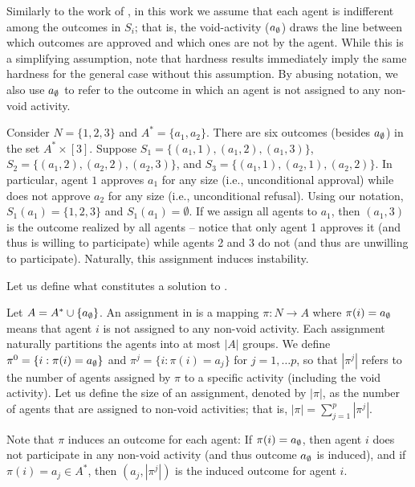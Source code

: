 Similarly to the work of \cite{GASP12WINE}, in this work we assume that each agent is indifferent among the outcomes in $S_i$; that is, the void-activity ($a_{\emptyset}$) draws the line between which outcomes are approved and which ones are not by the agent. While this is a simplifying assumption, note that hardness results immediately imply the same hardness for the general case without this assumption. By abusing notation, we also use $a_{\emptyset}$ to refer to the outcome in which an agent is not assigned to any non-void activity. 

\begin{example} \label{GASP:eg:notation}
	Consider $N = \{1, 2, 3\}$ and $A^* = \{a_1, a_2\}$. There are six outcomes (besides $a_{\emptyset}$) in the set $A^* \times [3]$. 
	Suppose $S_1 = \{(a_1, 1), (a_1, 2), (a_1, 3)\}$, $S_2 = \{(a_1,2), (a_2,2), (a_2, 3)\}$, and $S_3 = \{(a_1,1), (a_2, 1), (a_2, 2)\}$. In particular, agent $1$ approves $a_1$ for any size (i.e., unconditional approval) while does not approve $a_2$ for any size (i.e., unconditional refusal). Using our notation, $S_1(a_1) = \{1,2,3\}$ and $S_1(a_1) = \emptyset$. If we assign all agents to $a_1$, then $(a_1,3)$ is the outcome realized by all agents -- notice that only agent 1 approves it (and thus is willing to participate) while agents 2 and 3 do not (and thus are unwilling to participate). Naturally, this assignment induces instability. 
\end{example}


Let us define what constitutes a solution to \GASP.

\begin{definition} \label{GASP:def:assignment}
	Let $A = A^* \cup \{a_{\emptyset}\}$.
An assignment in \GASPs is a mapping $\pi: N \rightarrow A$ where $\pi(i) = a_{\emptyset}$ means that agent $i$ is not assigned to any non-void activity. 
Each assignment naturally partitions the agents into at most $|A|$ groups. We define $\pi^0 = \{i : \pi(i) = a_{\emptyset} \}$ and $\pi^j = \{i : \pi(i) = a_j\}$ for $j = 1, \dots p$, so that $|\pi^j|$ refers to the number of agents assigned by $\pi$ to a specific activity (including the void activity).
Let us define the size of an assignment, denoted by $|\pi|$, as the number of agents that are assigned to non-void activities; that is, $|\pi| = \sum_{j=1}^{p} |\pi^j|$.
\end{definition}

Note that $\pi$ induces an outcome for each agent: If $\pi(i) = a_{\emptyset}$, then agent $i$ does not participate in any non-void activity (and thus outcome $a_{\emptyset}$ is induced), and if $\pi(i) = a_j \in A^*$, then $(a_j, |\pi^j|)$ is the induced outcome for agent $i$.

